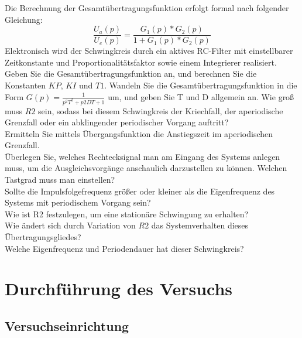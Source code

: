 Die Berechnung der Gesamtübertragungsfunktion erfolgt formal nach folgender Gleichung: \\
\newline
\begin{equation}
	\frac{ U_{ a }(p) }{ U_{ e }(p) } =\frac{ G_{ 1 }(p)*G_{ 2 }(p) }{ 1+G_{ 1 }(p)*G_{ 2 }(p)  }
\end{equation}
\newline
Elektronisch wird der Schwingkreis durch ein aktives RC-Filter mit einstellbarer Zeitkonstante
und Proportionalitätsfaktor sowie einem Integrierer realisiert.\\
Geben Sie die Gesamtübertragungsfunktion an, und berechnen Sie die Konstanten $KP$, $KI$ und $T1$. 
Wandeln Sie die Gesamtübertragungsfunktion in die Form $G(p)=\frac{ 1 }{ p^{ 2 }T^{ 2 }+p2DT+1 }$ um, und geben Sie T und D allgemein an. 
Wie groß muss $R2$ sein, sodass bei diesem Schwingkreis der Kriechfall, der aperiodische Grenzfall oder ein 
abklingender periodischer Vorgang auftritt?\\
\newline%
Ermitteln Sie mittels Übergangsfunktion die Anstiegszeit im 
aperiodischen Grenzfall. \\
Überlegen Sie, welches Rechtecksignal man am Eingang des Systems anlegen muss, um die 
Ausgleichsvorgänge anschaulich darzustellen zu können. Welchen Tastgrad muss man einstellen?\\
\newline%
Sollte die Impulsfolgefrequenz größer oder kleiner als die Eigenfrequenz des Systems mit periodischem Vorgang sein?\\
\newline%
Wie ist R2 festzulegen, um eine stationäre Schwingung zu erhalten?\\
\newline%
Wie ändert sich durch Variation von $R2$ das Systemverhalten dieses Übertragungsgliedes?\\
\newline%
Welche Eigenfrequenz und Periodendauer hat dieser Schwingkreis?\\
\newline%

\section{Durchführung des Versuchs}

\subsection{Versuchseinrichtung}

